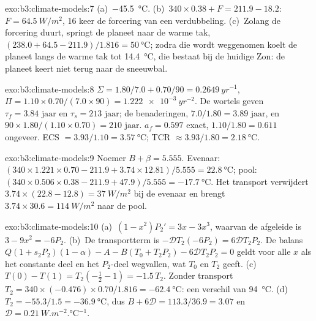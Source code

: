 \begin{solution}{exo:b3:climate-models:7}
(a)~\qty{-45.5}{\celsius}. (b)~$340\times0.38 + F = 211.9 - 18.2$: $F =
\qty{64.5}{W/m^2}$, 16 keer de forcering van een verdubbeling. (c)~Zolang de
forcering duurt, springt de planeet naar de warme tak, $(238.0 + 64.5 -
211.9)/1.816 = \qty{50}{\celsius}$; zodra die wordt weggenomen koelt de planeet
langs de warme tak tot \qty{14.4}{\celsius}, die bestaat bij de huidige Zon:
de planeet keert niet terug naar de sneeuwbal.
\end{solution}

\begin{solution}{exo:b3:climate-models:8}
$\Sigma = 1.80/7.0 + 0.70/90 = \qty{0.2649}{yr^{-1}}$, $\Pi = 1.10\times0.70/
(7.0\times90) = \qty{1.222e-3}{yr^{-2}}$. De wortels geven $\tau_f =
\num{3.84}\text{ jaar}$ en $\tau_s = \num{213}\text{ jaar}$; de benaderingen,
$7.0/1.80 = \num{3.89}\text{ jaar}$, en $90\times1.80/(1.10\times0.70) =
\num{210}\text{ jaar}$. $a_f = 0.597$ exact, $1.10/1.80 = 0.611$
ongeveer. ECS $= 3.93/1.10 = \qty{3.57}{\celsius}$; TCR $\approx
3.93/1.80 = \qty{2.18}{\celsius}$.
\end{solution}

\begin{solution}{exo:b3:climate-models:9}
Noemer $B + \beta = \num{5.555}$. Evenaar: $(340\times1.221\times0.70 -
211.9 + 3.74\times12.81)/5.555 = \qty{22.8}{\celsius}$; pool:
$(340\times0.506\times0.38 - 211.9 + 47.9)/5.555 = \qty{-17.7}{\celsius}$.
Het transport verwijdert $3.74\times(22.8 - 12.8) = \qty{37}{W/m^2}$ bij de
evenaar en brengt $3.74\times30.6 = \qty{114}{W/m^2}$ naar de pool.
\end{solution}

\begin{solution}{exo:b3:climate-models:10}
(a)~$(1 - x^2)P_2' = 3x - 3x^3$, waarvan de afgeleide is $3 - 9x^2 = -6P_2$.
(b)~De transportterm is $-\mathcal D T_2(-6P_2) = 6\mathcal DT_2P_2$.
De balans $Q(1 + s_2P_2)(1 - \alpha) - A - B(T_0 + T_2P_2) - 6\mathcal
DT_2P_2 = 0$ geldt voor alle $x$ als het constante deel en het $P_2$-deel
wegvallen, wat $T_0$ en $T_2$ geeft. (c)~$T(0) - T(1) = T_2(-\tfrac12 - 1)
= -1.5\,T_2$. Zonder transport $T_2 = 340\times(-0.476)\times0.70/1.816 =
\qty{-62.4}{\celsius}$: een verschil van \qty{94}{\celsius}. (d)~$T_2 =
-55.3/1.5 = \qty{-36.9}{\celsius}$, dus $B + 6\mathcal D = 113.3/36.9 =
3.07$ en $\mathcal D = \qty{0.21}{W.m^{-2}.\celsius^{-1}}$.
\end{solution}

